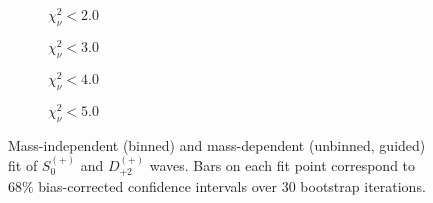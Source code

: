 \begin{figure}[htbp]
    \centering
    \begin{subfigure}{0.45\textwidth}
        
        \caption{$\chi^2_\nu < 2.0$}
    \end{subfigure}
    \hfill
    \begin{subfigure}{0.45\textwidth}
        
        \caption{$\chi^2_\nu < 3.0$}
    \end{subfigure}
    \vspace{1em}
    \begin{subfigure}{0.45\textwidth}
        
        \caption{$\chi^2_\nu < 4.0$}
    \end{subfigure}
    \hfill
    \begin{subfigure}{0.45\textwidth}
        
        \caption{$\chi^2_\nu < 5.0$}
    \end{subfigure}

    \caption{Mass-independent (binned) and mass-dependent (unbinned, guided) fit of $S_{0}^{(+)}$ and $D_{+2}^{(+)}$ waves. Bars on each fit point correspond to $68\%$ bias-corrected confidence intervals over $ 30 $ bootstrap iterations.}
    \label{fig:unbinned-guided-fit-all-Sp-D2p}
\end{figure}

